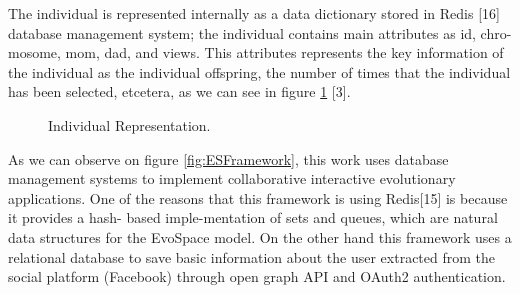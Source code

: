 The individual is represented internally as a data dictionary stored in Redis
[16] database management system; the individual contains main attributes as id,
chro-mosome, mom, dad, and views. This attributes represents the key information
of the individual as the individual offspring, the number of times that the
individual has been selected, etcetera, as we can see in figure \ref{fig:individualRep} [3].

\begin{figure}
	\captionsetup{justification=centering,margin=2cm}
	\centering
	\setlength\fboxsep{0pt}
	\setlength\fboxrule{0.7pt}
	\caption{Individual Representation.}
	\label{fig:individualRep}       
\end{figure}

As we can observe on figure \ref{fig:ESFramework}, this work uses database management systems to
implement collaborative interactive evolutionary applications. One of the
reasons that this framework is using Redis[15] is because it provides a hash-
based imple-mentation of sets and queues, which are natural data structures for
the EvoSpace model. On the other hand this framework uses a relational database
to save basic information about the user extracted from the social platform
(Facebook) through open graph API and OAuth2 authentication.

